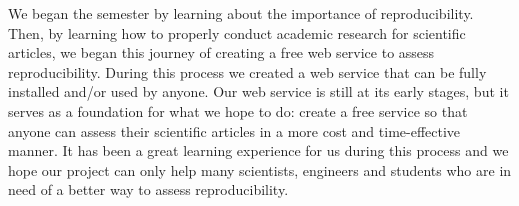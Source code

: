\documentclass[
10pt, %
a4paper, %
oneside, %
headinclude,footinclude, %
BCOR5mm, %
]{scrartcl}
\begin{document}
We began the semester by learning about the importance of reproducibility. Then, by learning how to properly conduct academic research for scientific articles, we began 
this journey of creating a free web service to assess reproducibility. During this process we created a web service that can be fully installed and/or used by anyone. Our 
web service is still at its early stages, but it serves as a foundation for what we hope to do: create a free service so that anyone can assess their scientific articles in a more 
cost and time-effective manner. It has been a great learning experience for us during this process and we hope our project can only help many scientists, engineers and students who are in need 
of a better way to assess reproducibility. 









\renewcommand{\refname}{\spacedlowsmallcaps{References}} %



\appendix
\end{document}
